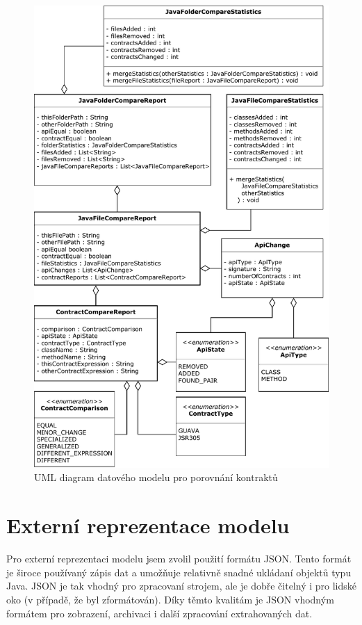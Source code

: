 		
				\begin{figure}[!htb]
						\centering
						\includegraphics[width=1\textwidth]{img/modelComparatorDiagram.pdf}
						\caption[modelComparatorDiagram]{UML diagram datového modelu pro porovnání kontraktů}
						\label{modelComparatorDiagram}
					\endminipage\hfill
				\end{figure}

			
	\section{Externí reprezentace modelu}
		Pro externí reprezentaci modelu jsem zvolil použití formátu JSON. Tento formát je široce používaný zápis dat a umožňuje relativně snadné ukládaní objektů typu Java. JSON je tak vhodný pro zpracovaní strojem, ale je dobře čitelný i pro lidské oko (v případě, že byl zformátován). Díky těmto kvalitám je JSON vhodným formátem pro zobrazení, archivaci i další zpracování extrahovaných dat.\\
			
